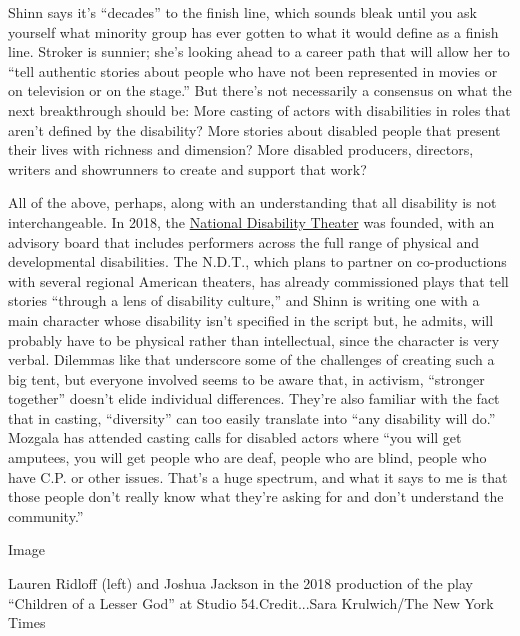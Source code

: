 Shinn says it's ``decades'' to the finish line, which sounds bleak until
you ask yourself what minority group has ever gotten to what it would
define as a finish line. Stroker is sunnier; she's looking ahead to a
career path that will allow her to ``tell authentic stories about people
who have not been represented in movies or on television or on the
stage.'' But there's not necessarily a consensus on what the next
breakthrough should be: More casting of actors with disabilities in
roles that aren't defined by the disability? More stories about disabled
people that present their lives with richness and dimension? More
disabled producers, directors, writers and showrunners to create and
support that work?

All of the above, perhaps, along with an understanding that all
disability is not interchangeable. In 2018, the
\href{https://www.nationaldisabilitytheatre.org/}{National Disability
Theater} was founded, with an advisory board that includes performers
across the full range of physical and developmental disabilities. The
N.D.T., which plans to partner on co-productions with several regional
American theaters, has already commissioned plays that tell stories
``through a lens of disability culture,'' and Shinn is writing one with
a main character whose disability isn't specified in the script but, he
admits, will probably have to be physical rather than intellectual,
since the character is very verbal. Dilemmas like that underscore some
of the challenges of creating such a big tent, but everyone involved
seems to be aware that, in activism, ``stronger together'' doesn't elide
individual differences. They're also familiar with the fact that in
casting, ``diversity'' can too easily translate into ``any disability
will do.'' Mozgala has attended casting calls for disabled actors where
``you will get amputees, you will get people who are deaf, people who
are blind, people who have C.P. or other issues. That's a huge spectrum,
and what it says to me is that those people don't really know what
they're asking for and don't understand the community.''

Image

Lauren Ridloff (left) and Joshua Jackson in the 2018 production of the
play ``Children of a Lesser God'' at Studio 54.Credit...Sara
Krulwich/The New York Times

